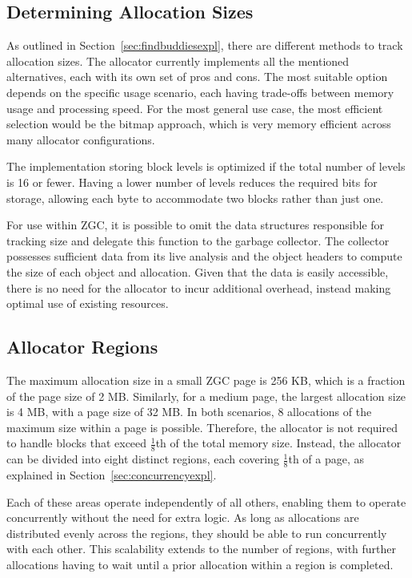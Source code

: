 \subsection{Determining Allocation Sizes}
As outlined in Section~\ref{sec:findbuddiesexpl}, there are different methods to track allocation sizes. The allocator currently implements all the mentioned alternatives, each with its own set of pros and cons. The most suitable option depends on the specific usage scenario, each having trade-offs between memory usage and processing speed. For the most general use case, the most efficient selection would be the bitmap approach, which is very memory efficient across many allocator configurations.

The implementation storing block levels is optimized if the total number of levels is 16 or fewer. Having a lower number of levels reduces the required bits for storage, allowing each byte to accommodate two blocks rather than just one.

For use within ZGC, it is possible to omit the data structures responsible for tracking size and delegate this function to the garbage collector. The collector possesses sufficient data from its live analysis and the object headers to compute the size of each object and allocation. Given that the data is easily accessible, there is no need for the allocator to incur additional overhead, instead making optimal use of existing resources.

\subsection{Allocator Regions}
The maximum allocation size in a small ZGC page is 256 KB, which is a fraction of the page size of 2 MB. Similarly, for a medium page, the largest allocation size is 4 MB, with a page size of 32 MB. In both scenarios, 8 allocations of the maximum size within a page is possible. Therefore, the allocator is not required to handle blocks that exceed $\frac{1}{8}$th of the total memory size. Instead, the allocator can be divided into eight distinct regions, each covering $\frac{1}{8}$th of a page, as explained in Section~\ref{sec:concurrencyexpl}.

Each of these areas operate independently of all others, enabling them to operate concurrently without the need for extra logic. As long as allocations are distributed evenly across the regions, they should be able to run concurrently with each other. This scalability extends to the number of regions, with further allocations having to wait until a prior allocation within a region is completed.

